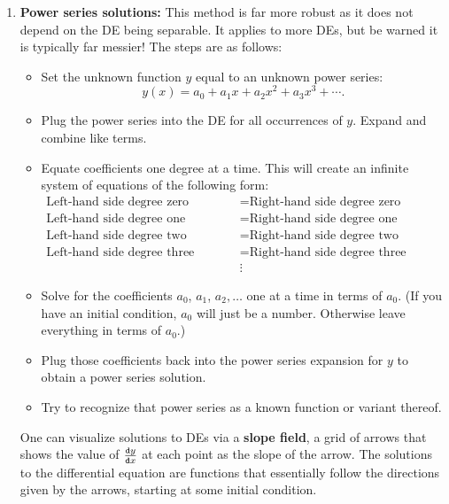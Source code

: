 \begin{enumerate}
\item {\bf Power series solutions:}  This method is far more robust as it does not depend on the DE being separable.  It applies to more DEs, but be warned it is typically far messier!  The steps are as follows:
\begin{itemize}
\item Set the unknown function $y$ equal to an unknown power series: $$y(x)=a_0+a_1x+a_2x^2+a_3x^3+\cdots. $$
\item Plug the power series into the DE for all occurrences of $y$.  Expand and combine like terms. 
\item Equate coefficients one degree at a time.  This will create an infinite system of equations of the following form: \begin{align*}
\text{Left-hand side degree zero coefficient} &=\text{Right-hand side degree zero coefficient} \\
\text{Left-hand side degree one coefficient} &=\text{Right-hand side degree one coefficient} \\
\text{Left-hand side degree two coefficient} &=\text{Right-hand side degree two coefficient} \\
\text{Left-hand side degree three coefficient} &=\text{Right-hand side degree three coefficient} \\
&\vdots
\end{align*}
\item Solve for the coefficients $a_0$, $a_1$, $a_2, \ldots$ one at a time in terms of $a_0$.  (If you have an initial condition, $a_0$ will just be a number. Otherwise leave everything in terms of $a_0$.) 
\item Plug those coefficients back into the power series expansion for $y$ to obtain a power series solution. \item Try to recognize that power series as a known function or variant thereof.  
\end{itemize}
One can visualize solutions to DEs via a {\bf slope field}, a grid of arrows that shows the value of $\frac{\mathop{}\!\mathtt{d} y}{\mathop{}\!\mathtt{d} x}$ at each point as the slope of the arrow.  The solutions to the differential equation are functions that essentially follow the directions given by the arrows, starting at some initial condition.
\end{enumerate}